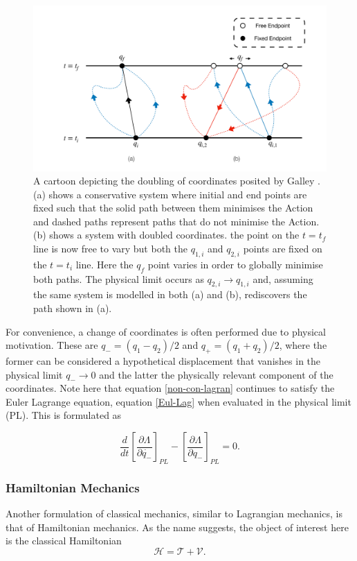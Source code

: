 \documentclass[10pt]{iopart}
\begin{document}
\begin{figure}
	\centering
	\includegraphics[width=\columnwidth]{Endpoints.pdf}
	\caption{A cartoon depicting the doubling of coordinates posited by Galley \cite{Galley}. (a) shows a conservative system where initial and end points are fixed such that the solid path between them minimises the Action and dashed paths represent paths that do not minimise the Action. (b) shows a system with doubled coordinates. the point on the $t=t_f$ line is now free to vary but both the $q_{1,i}$ and $q_{2,i}$ points are fixed on the $t=t_i$ line. Here the $q_f$ point varies in order to globally minimise both paths. The physical limit occurs as $q_{2,i}\to q_{1,i}$ and, assuming the same system is modelled in both (a) and (b), rediscovers the path shown in (a).}
		\label{doubledCoords}
\end{figure}

For convenience, a change of coordinates is often performed due to physical motivation. These are $q_- = (q_1 - q_2)/2$ and $q_+ = (q_1 + q_2)/2$, where the former can be considered a hypothetical displacement that vanishes in the physical limit $q_- \to 0$ and the latter the physically relevant component of the coordinates.
Note here that equation \ref{non-con-lagran} continues to satisfy the Euler Lagrange equation, equation \ref{Eul-Lag} when evaluated in the physical limit (PL). This is formulated as

\begin{equation}
\label{NonConEulerLagrange}
	\frac{d}{dt} \left[\frac{\partial \Lambda}{\partial \dot{q_-}}\right]_{PL} - \left[\frac{\partial\Lambda}{\partial q_-}\right]_{PL} = 0.
\end{equation}

\subsubsection{Hamiltonian Mechanics \\}
Another formulation of classical mechanics, similar to Lagrangian mechanics, is that of Hamiltonian mechanics. As the name suggests, the object of interest here is the classical Hamiltonian 
\begin{equation}
\label{Hamiltonian}
	\mathcal H =\mathcal T +\mathcal V.
\end{equation}
\end{document}
